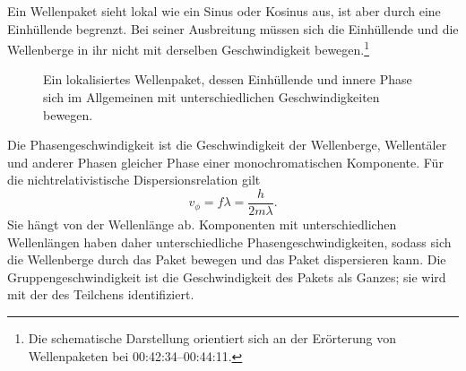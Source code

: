 \begin{classroomqa}\end{classroomqa}

Ein Wellenpaket sieht lokal wie ein Sinus oder Kosinus aus, ist aber durch eine Einhüllende begrenzt. Bei seiner Ausbreitung müssen sich die Einhüllende und die Wellenberge in ihr nicht mit derselben Geschwindigkeit bewegen.\footnote{Die schematische Darstellung orientiert sich an der Erörterung von Wellenpaketen bei 00:42:34--00:44:11.}

\begin{figure}[t]\centering
{}\caption{Ein lokalisiertes Wellenpaket, dessen Einhüllende und innere Phase sich im Allgemeinen mit unterschiedlichen Geschwindigkeiten bewegen.}\end{figure}

Die Phasengeschwindigkeit ist die Geschwindigkeit der Wellenberge, Wellentäler und anderer Phasen gleicher Phase einer monochromatischen Komponente. Für die nichtrelativistische Dispersionsrelation gilt
\begin{equation}
v_\phi=f\lambda=\frac{h}{2m\lambda}.
\end{equation}
Sie hängt von der Wellenlänge ab. Komponenten mit unterschiedlichen Wellenlängen haben daher unterschiedliche Phasengeschwindigkeiten, sodass sich die Wellenberge durch das Paket bewegen und das Paket dispersieren kann. Die Gruppengeschwindigkeit ist die Geschwindigkeit des Pakets als Ganzes; sie wird mit der des Teilchens identifiziert.

